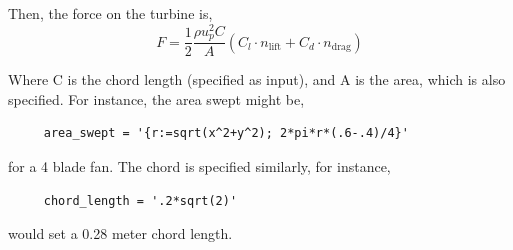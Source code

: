 \documentclass{article}
\begin{document}
Then, the force on the turbine is, 
\begin{equation}
 \boxed{F = \frac{1}{2}\frac{\rho u_p^2 C}{A}\left(C_l \cdot
					      n_\text{lift} + C_d \cdot n_\text{drag}  \right)}
\end{equation}

Where C is the chord length (specified as input), and A is the area,
which is also specified. For instance, the area swept might be, 
\begin{lstlisting}
     area_swept = '{r:=sqrt(x^2+y^2); 2*pi*r*(.6-.4)/4}'
\end{lstlisting}
for a 4 blade fan. The chord is specified similarly, for instance, 
\begin{lstlisting}
     chord_length = '.2*sqrt(2)'
\end{lstlisting}
would set a 0.28 meter chord length. 
%




\end{document}
